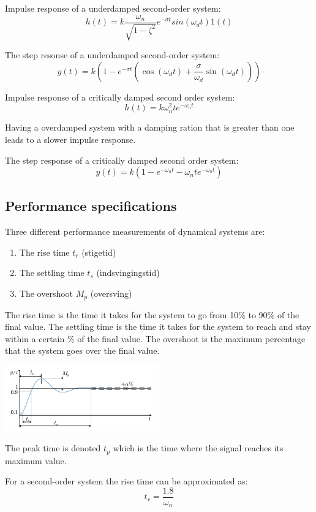 \newpage
Impulse response of a underdamped second-order system:
$$h(t) = k \frac{\omega_n}{\sqrt{1-\zeta ^2}} e^{-\sigma t} sin(\omega_d t) 1(t) $$

The step resonse of a underdamped second-order system:
$$y(t) = k(1-e^{-\sigma t}(\cos(\omega_d t)+\frac{\sigma}{\omega_d}\sin(\omega_d t)))$$

Impulse response of a critically damped second order system:
$$h(t) = k\omega_n^2te^{-\omega_n t}$$

Having a overdamped system with a damping ration that is greater than one leads to a slower impulse response.

The step response of a critically damped second order system:
$$y(t) = k(1-e^{-\omega_nt}-\omega_n te^{-\omega_nt})$$

\subsection{Performance specifications}

Three different performance measurements of dynamical systems are:
\begin{enumerate}
	\item{The rise time $t_r$ (stigetid)}
	\item{The settling time $t_s$ (indsvingingstid)}
	\item{The overshoot $M_p$ (oversving)}
\end{enumerate}

The rise time is the time it takes for the system to go from 10\% to 90\% of the final value.
The settling time is the time it takes for the system to reach and stay within a certain \% of the final value.
The overshoot is the maximum percentage that the system goes over the final value.

\begin{center}
	\includegraphics[width=0.5\textwidth]{Images/performance.png}
\end{center}

The peak time is denoted $t_p$ which is the time where the signal reaches its maximum value.

For a second-order system the rise time can be approximated as:
$$t_r = \frac{1.8}{\omega_n}$$

